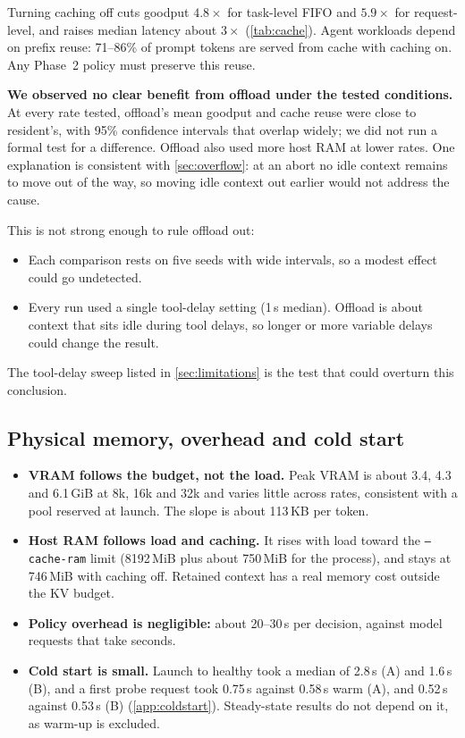 Turning caching off cuts goodput $4.8\times$ for task-level FIFO and $5.9\times$ for request-level, and raises median latency about $3\times$ (\cref{tab:cache}). Agent workloads depend on prefix reuse: 71--86\% of prompt tokens are served from cache with caching on. Any Phase~2 policy must preserve this reuse.

\textbf{We observed no clear benefit from offload under the tested conditions.} At every rate tested, offload's mean goodput and cache reuse were close to resident's, with 95\% confidence intervals that overlap widely; we did not run a formal test for a difference. Offload also used more host RAM at lower rates. One explanation is consistent with \cref{sec:overflow}: at an abort no idle context remains to move out of the way, so moving idle context out earlier would not address the cause.

This is not strong enough to rule offload out:
\begin{itemize}
  \item Each comparison rests on five seeds with wide intervals, so a modest effect could go undetected.
  \item Every run used a single tool-delay setting (1\,s median). Offload is about context that sits idle during tool delays, so longer or more variable delays could change the result.
\end{itemize}
The tool-delay sweep listed in \cref{sec:limitations} is the test that could overturn this conclusion.

\subsection{Physical memory, overhead and cold start}\label{sec:physical}

\begin{itemize}
  \item \textbf{VRAM follows the budget, not the load.} Peak VRAM is about 3.4, 4.3 and 6.1\,GiB at 8k, 16k and 32k and varies little across rates, consistent with a pool reserved at launch. The slope is about 113\,KB per token.
  \item \textbf{Host RAM follows load and caching.} It rises with load toward the \texttt{--cache-ram} limit (8192\,MiB plus about 750\,MiB for the process), and stays at 746\,MiB with caching off. Retained context has a real memory cost outside the KV budget.
  \item \textbf{Policy overhead is negligible:} about 20--30\,\textmu s per decision, against model requests that take seconds.
  \item \textbf{Cold start is small.} Launch to healthy took a median of 2.8\,s (A) and 1.6\,s (B), and a first probe request took 0.75\,s against 0.58\,s warm (A), and 0.52\,s against 0.53\,s (B) (\cref{app:coldstart}). Steady-state results do not depend on it, as warm-up is excluded.
\end{itemize}

